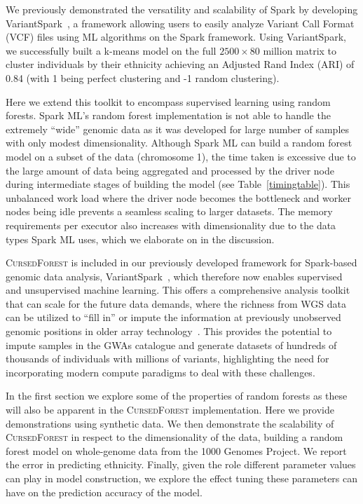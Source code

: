 \documentclass[10pt,letterpaper]{article}
\newcommand{\cursedforest}{\textsc{CursedForest}\xspace}
\begin{document}
We previously demonstrated the versatility and scalability of Spark by developing VariantSpark~\cite{OBrien2015}, a
framework allowing users to easily analyze Variant Call Format (VCF) files using ML algorithms on the Spark framework.
Using VariantSpark, we successfully built a k-means model on the full $2500 \times 80$ million matrix to cluster
individuals by their ethnicity achieving an Adjusted Rand Index (ARI) of 0.84 (with 1 being perfect clustering and -1
random clustering).

Here we extend this toolkit to encompass supervised learning using random forests.  Spark ML's random forest
implementation is not able to handle the extremely ``wide'' genomic data as it was developed for large number of samples
with only modest dimensionality.  Although Spark ML can build a random forest model on a subset of the data (chromosome
1), the time taken is excessive due to the large amount of data being aggregated and processed by the driver node during
intermediate stages of building the model (see Table~\ref{timingtable}).  This unbalanced work load where the driver
node becomes the bottleneck and worker nodes being idle prevents a seamless scaling to larger datasets. The memory
requirements per executor also increases with dimensionality due to the data types Spark ML uses, which we elaborate on
in the discussion.

\cursedforest is included in our previously developed framework for Spark-based genomic data analysis,
VariantSpark~\cite{OBrien2015}, which therefore now enables supervised and unsupervised machine learning. This offers a
comprehensive analysis toolkit that can scale for the future data demands, where the richness from WGS data can be
utilized to ``fill in'' or impute the information at previously unobserved genomic positions in older array
technology~\cite{Howie2012}.  This provides the potential to impute samples in the GWAs catalogue and generate datasets
of hundreds of thousands of individuals with millions of variants, highlighting the need for incorporating modern
compute paradigms to deal with these challenges.

In the first section we explore some of the properties of random forests as these will also be apparent in the
\cursedforest implementation. Here we provide demonstrations using synthetic data.  We then demonstrate the scalability
of \cursedforest in respect to the dimensionality of the data, building a random forest model on whole-genome data from
the 1000 Genomes Project. We report the error in predicting ethnicity.  Finally, given the role
different parameter values can play in model construction, we explore the effect tuning these parameters can have on the
prediction accuracy of the model.
\end{document}
